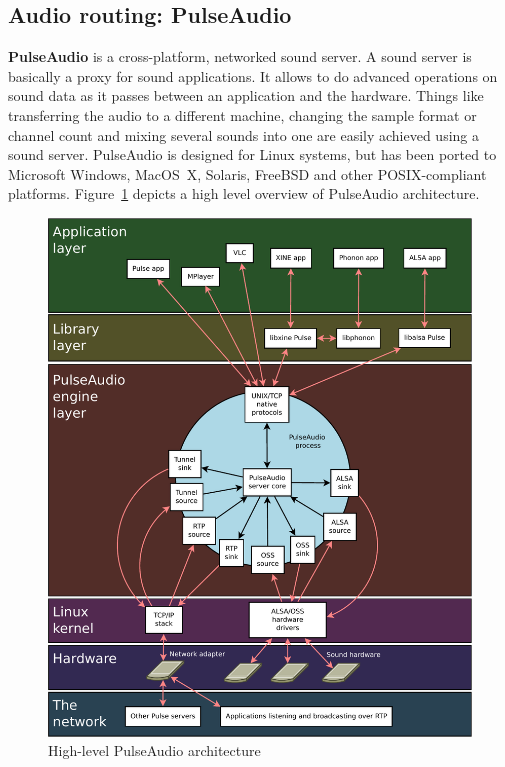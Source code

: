 \documentclass[conference]{IEEEtran}
\begin{document}
\subsection{Audio routing: PulseAudio}
\textbf{PulseAudio} is a cross-platform, networked sound server. A sound server is basically a proxy for sound applications. It allows to do advanced operations on sound data as it passes between an application and the hardware. Things like transferring the audio to a different machine, changing the sample format or channel count and mixing several sounds into one are easily achieved using a sound server. PulseAudio is designed for Linux systems, but has been ported to Microsoft Windows, MacOS~X, Solaris, FreeBSD and other POSIX-compliant platforms. Figure~\ref{pa} depicts a high level overview of PulseAudio architecture.

\begin{figure}[h]
\centering
\includegraphics[width=\columnwidth]{PulseAudio}
\caption{High-level PulseAudio architecture}
\label{pa}
\end{figure}
\end{document}
